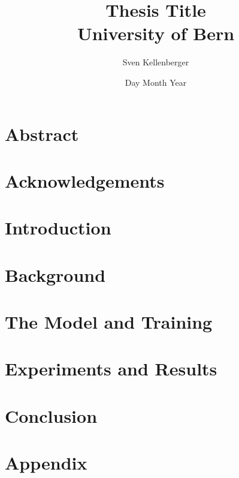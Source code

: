 \documentclass[12pt, twoside]{report}
\begin{document}
\title{
	{Thesis Title}\\
	{\large University of Bern}
}
\author{Sven Kellenberger}
\date{Day Month Year}

\maketitle

\chapter*{Abstract}


\chapter*{Acknowledgements}


\tableofcontents

\chapter{Introduction}


\chapter{Background}


\chapter{The Model and Training}


\chapter{Experiments and Results}


\chapter{Conclusion}


\printbibliography

\appendix
\chapter{Appendix}

\end{document}
